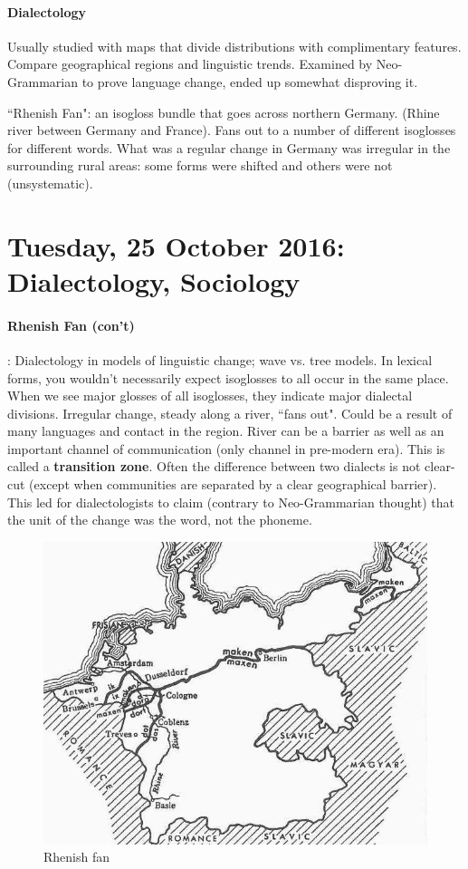 \documentclass{exam}
\begin{document}
\paragraph{Dialectology} Usually studied with maps that divide distributions with complimentary features. Compare geographical regions and linguistic trends. Examined by Neo-Grammarian to prove language change, ended up somewhat disproving it. 

``Rhenish Fan": an isogloss bundle that goes across northern Germany. (Rhine river between Germany and France). Fans out to a number of different isoglosses for different words. What was a regular change in Germany was irregular in the surrounding rural areas: some forms were shifted and others were not (unsystematic). 

\section*{Tuesday, 25 October 2016: Dialectology, Sociology}

\paragraph{Rhenish Fan (con't)}: Dialectology in models of linguistic change; wave vs. tree models. In lexical forms, you wouldn't necessarily expect isoglosses to all occur in the same place. When we see major glosses of all isoglosses, they indicate major dialectal divisions. Irregular change, steady along a river, ``fans out". Could be a result of many languages and contact in the region. River can be a barrier as well as an important channel of communication (only channel in pre-modern era). This is called a \textbf{transition zone}. Often the difference between two dialects is not clear-cut (except when communities are separated by a clear geographical barrier). This led for dialectologists to claim (contrary to Neo-Grammarian thought) that the unit of the change was the word, not the phoneme. 


\begin{figure} [h!]
    \centering
    \includegraphics[scale=1.5]{images/rhenish_fan.jpg}
    \caption{Rhenish fan}
    \label{fig:my_label}
\end{figure}
\end{document}
